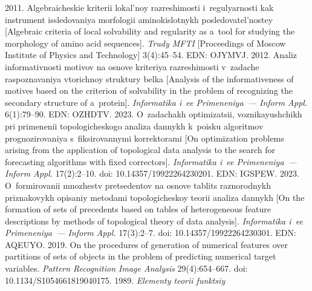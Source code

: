   \begin{multicols}{2}

\renewcommand{\bibname}{\protect\rmfamily References}

{\small\frenchspacing
 {%
 \begin{thebibliography}{9} 
 2011. 
Algebraicheskie kriterii lokal'noy razreshimosti i~re\-gu\-lyar\-nosti kak instrument 
issledovaniya morfologii ami\-no\-kis\-lot\-nykh posledovatel'nostey [Algebraic criteria of local solvability and regularity as a~tool
for studying the morphology of amino acid sequences]. \textit{Trudy MFTI} [Proceedings 
of Moscow Institute of Physics and Technology] 3(4):45--54. EDN: OJYMVJ.
 2012. Analiz informativnosti motivov na 
osnove kriteriya razreshimosti v~zadache raspoznavaniya vtorichnoy struktury belka 
[Analysis of the informativeness of motives based on the criterion of solvability in 
the problem of recognizing the secondary structure of a~protein]. \textit{Informatika 
i~ee Primeneniya~--- Inform Appl.} 6(1):79--90. EDN: OZHDTV.
 2023. O~zadachakh optimizatsii, voznikayushchikh pri 
primenenii topologicheskogo analiza dannykh k~poisku algoritmov prognozirovaniya 
s~fiksirovannymi korrektorami [On optimization problems arising from the 
application of topological data analysis to the search for forecasting algorithms with 
fixed correctors]. \textit{Informatika i~ee Primeneniya~--- Inform Appl.} 
 17(2):2--10. doi: 10.14357/19922264230201. EDN: IGSPEW.
 2023. O~formirovanii mnozhestv pretsedentov na osnove 
tablits raznorodnykh priznakovykh opisaniy metodami topologicheskoy teorii analiza 
dannykh [On the formation of sets of precedents based on tables of heterogeneous 
feature descriptions by methods of topological theory of data analysis]. 
\textit{Informatika i~ee Primeneniya~--- Inform Appl.} 17(3):2--7. doi: 
10.14357/19922264230301. EDN: AQEUYO.
 2019. On the procedures of generation of 
numerical features over partitions of sets of objects in the problem of predicting 
numerical target variables. \textit{Pattern Recognition Image Analysis} 29(4):654--667. 
doi: 10.1134/S1054661819040175.
 1989. \textit{Elementy teorii funktsiy 
}
\end{thebibliography}}}
\end{multicols}
